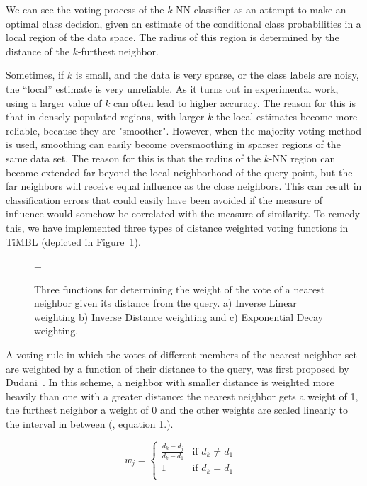 \documentclass{report}
\begin{document}
We can see the voting process of the $k$-NN classifier as an attempt
to make an optimal class decision, given an estimate of the
conditional class probabilities in a local region of the data space.
The radius of this region is determined by the distance of the
$k$-furthest neighbor.

Sometimes, if $k$ is small, and the data is very sparse, or the class
labels are noisy, the ``local'' estimate is very unreliable.  As it
turns out in experimental work, using a larger value of $k$ can often
lead to higher accuracy. The reason for this is that in densely
populated regions, with larger $k$ the local estimates become more
reliable, because they are "smoother".  However, when the majority
voting method is used, smoothing can easily become oversmoothing in
sparser regions of the same data set. The reason for this is that the
radius of the $k$-NN region can become extended far beyond the local
neighborhood of the query point, but the far neighbors will receive
equal influence as the close neighbors. This can result in
classification errors that could easily have been avoided if the
measure of influence would somehow be correlated with the measure of
similarity. To remedy this, we have implemented three types of distance 
weighted voting functions in TiMBL (depicted in 
Figure~\ref{dist-weight-fig}).

\begin{figure}[htb]
        \begin{center}
                \leavevmode
                \epsfxsize=\columnwidth
                \caption{Three functions for determining the weight of the vote
of a nearest neighbor given its distance
from the query. a) Inverse Linear weighting b) Inverse Distance weighting and
c) Exponential Decay weighting.
                }
                \label{dist-weight-fig}
        \end{center}
\end{figure}

A voting rule in which the votes of different members of the nearest
neighbor set are weighted by a function of their distance to the
query, was first proposed by Dudani~. In this scheme, a
neighbor with smaller distance is weighted more heavily than one with
a greater distance: the nearest neighbor gets a weight of 1, the
furthest neighbor a weight of 0 and the other weights are scaled
linearly to the interval in between (, equation 1.).

\begin{equation}
\label{dudani_eq}
w_{j}= \left \{ \begin{array}{ll}  
                        \frac{d_{k} - d_{j}}{d_{k} - d_{1}} & \mbox{if $d_{k}
\not= d_{1}$ } \\ 
                        1 & \mbox{if $d_{k} = d_{1}$}\\
                    \end{array} 
          \right. 
\end{equation}
\end{document}
